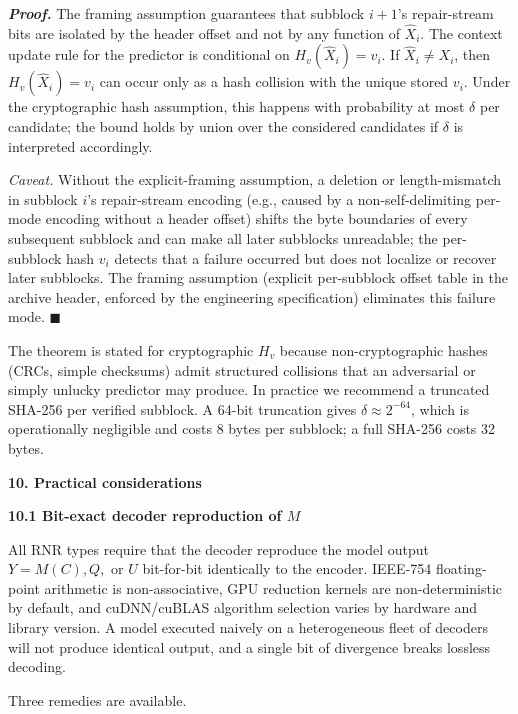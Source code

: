\documentclass[
]{article}
\begin{document}
\emph{\textbf{Proof.}} The framing assumption guarantees that
subblock $i + 1$'s repair-stream bits are isolated by the header
offset and not by any function of $\hat{X}_i$. The context update
rule for the predictor is conditional on $H_v(\hat{X}_i) = v_i$. If
$\hat{X}_i \neq X_i$, then $H_v(\hat{X}_i) = v_i$ can occur only as
a hash collision with the unique stored $v_i$. Under the
cryptographic hash assumption, this happens with probability at
most $\delta$ per candidate; the bound holds by union over the
considered candidates if $\delta$ is interpreted accordingly.

\emph{Caveat.} Without the explicit-framing assumption, a deletion
or length-mismatch in subblock $i$'s repair-stream encoding (e.g.,
caused by a non-self-delimiting per-mode encoding without a header
offset) shifts the byte boundaries of every subsequent subblock and
can make all later subblocks unreadable; the per-subblock hash $v_i$
detects that a failure occurred but does not localize or recover
later subblocks. The framing assumption (explicit per-subblock
offset table in the archive header, enforced by the engineering
specification) eliminates this failure mode.
\hfill$\blacksquare$

The theorem is stated for cryptographic $H_v$ because
non-cryptographic hashes (CRCs, simple checksums) admit structured
collisions that an adversarial or simply unlucky predictor may
produce. In practice we recommend a truncated SHA-256 per verified
subblock. A 64-bit truncation gives $\delta \approx 2^{-64}$, which
is operationally negligible and costs 8 bytes per subblock; a full
SHA-256 costs 32 bytes.

\textbf{10. Practical considerations}

\textbf{10.1 Bit-exact decoder reproduction of $M$}

All RNR types require that the decoder reproduce the model output
$Y = M(C), Q,$ or $U$ bit-for-bit identically to the encoder. IEEE-754
floating-point arithmetic is non-associative, GPU reduction kernels
are non-deterministic by default, and cuDNN/cuBLAS algorithm selection
varies by hardware and library version. A model executed naively on a
heterogeneous fleet of decoders will not produce identical output, and
a single bit of divergence breaks lossless decoding.

Three remedies are available.
\end{document}
